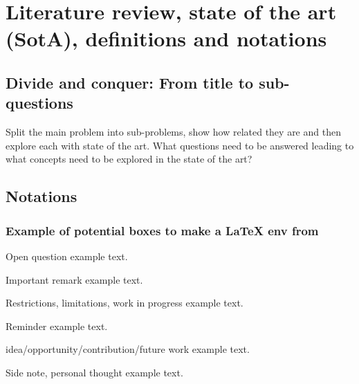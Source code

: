 \chapter{Literature review, state of the art (SotA), definitions and notations}

\section{Divide and conquer: From title to sub-questions}

Split the main problem into sub-problems, show how related they are and
then explore each with state of the art. What questions need to be answered
leading to what concepts need to be explored in the state of the art?

\section{Notations}

\subsection{Example of potential boxes to make a \LaTeX{} env from}
\begin{bclogo}[arrondi=0.1, logo=\bcquestion, couleur=grey,noborder=true]{Open question}
  example text.
\end{bclogo}


\begin{bclogo}[arrondi=0.1, logo=\bcattention, couleur=grey,noborder=true]{Important remark}
  example text.
\end{bclogo}

\begin{bclogo}[arrondi=0.1, logo=\bcpanchant, couleur=grey,noborder=true]{Restrictions, limitations, work in progress}
  example text.
\end{bclogo}

\begin{bclogo}[arrondi=0.1, logo=\bcinfo, couleur=grey,noborder=true]{Reminder}
  example text.
\end{bclogo}

\begin{bclogo}[arrondi=0.1, logo=\bclampe, couleur=grey,noborder=true]{idea/opportunity/contribution/future work}
  example text.
\end{bclogo}

\begin{bclogo}[arrondi=0.1, logo=\bccrayon, couleur=grey,noborder=true]{Side note, personal thought}
  example text.
\end{bclogo}

